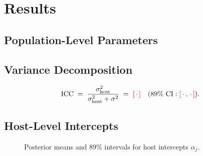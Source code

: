 \documentclass[11pt,a4paper]{article}
\begin{document}
\section{Results}\label{sec:results}

\subsection{Population-Level Parameters}

\subsection{Variance Decomposition}
\begin{equation}
  \mathrm{ICC} \;=\; \frac{\sigma_{\text{host}}^{2}}
                          {\sigma_{\text{host}}^{2} + \sigma^{2}}
  \;=\; \textcolor{red}{[\,\cdot\,]}
  \quad (89\%\ \text{CI}: \textcolor{red}{[\,\cdot\,,\,\cdot\,]}).
\end{equation}

\subsection{Host-Level Intercepts}
\begin{figure}[htbp]
\centering
\caption{Posterior means and 89\% intervals for host intercepts $\alpha_j$.}
\label{fig:caterpillar}
\end{figure}

\end{document}
